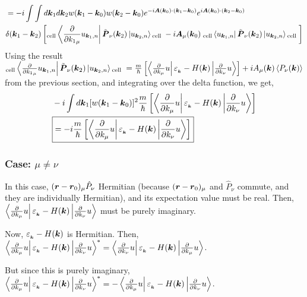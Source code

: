 \documentclass{report}
\renewcommand\vec[1]{\ensuremath\boldsymbol{#1}} %
\begin{document}
$$
\begin{aligned}
	& = -i \int \int d\vec{k}_1 d\vec{k}_2 w(\vec{k}_1 - \vec{k}_0) w(\vec{k}_2 - \vec{k}_0) e^{-i \vec{A}(\vec{k}_0)\cdot(\vec{k}_1 - \vec{k}_0)} e^{i \vec{A}(\vec{k}_0)\cdot(\vec{k}_2 - \vec{k}_0)} \\
	& \delta(\vec{k}_1 - \vec{k}_2) \left[ {}_{\text{cell}}\bra{\frac{\partial}{\partial {k_1}_\mu} u_{\vec{k}_1,n}} \tilde{\vec{P}}_\nu (\vec{k}_2) \ket{u_{\vec{k}_2,n}}{}_{\text{cell }} - i \vec{A}_\mu (\vec{k}_0) {}_{\text{  cell}}\bra{ u_{\vec{k}_1,n}} \tilde{\vec{P}}_\nu (\vec{k}_2) \ket{u_{\vec{k}_2,n}}{}_{\text{cell }} \right]
\end{aligned}
$$
Using the result ${}_{\text{cell}}\bra{\frac{\partial}{\partial {k_1}_\mu} u_{\vec{k}_1,n}} \tilde{\vec{P}}_\nu (\vec{k}_2) \ket{u_{\vec{k}_2,n}}{}_{\text{cell }} = \frac{m}{\hbar} \left[\bra{\frac{\partial}{\partial k_\mu} u}  \varepsilon_{_{\vec{k}}} - H(\vec{k}) \ket{\frac{\partial}{\partial k_\nu}u}\right]  +  i {A}_\mu(\vec{k}) \expval{{P}_\nu(\vec{k})}$ from the previous section, and integrating over the delta function, we get,
$$
\begin{aligned}
	& -i \int d\vec{k}_1  [w(\vec{k}_1 - \vec{k}_0)]^2  \frac{m}{\hbar} \left[\bra{\frac{\partial}{\partial k_\mu} u}  \varepsilon_{_{\vec{k}}} - H(\vec{k}) \ket{\frac{\partial}{\partial k_\nu}u}\right] \\
	& \boxed{= -i \frac{m}{\hbar} \left[\bra{\frac{\partial}{\partial k_\mu} u}  \varepsilon_{_{\vec{k}}} - H(\vec{k}) \ket{\frac{\partial}{\partial k_\nu}u}\right]}
\end{aligned}
$$
\subsubsection{Case: $\mu \neq \nu$}
In this case, $(\vec{r} - \vec{r}_0)_\mu \hat{P}_\nu$ Hermitian (because $(\vec{r} - \vec{r}_0)_\mu$ and $ \hat{P}_\nu$ commute, and they are individually Hermitian), and its expectation value must be real. Then, $ \bra{\frac{\partial}{\partial k_\mu} u}  \varepsilon_{_{\vec{k}}} - H(\vec{k}) \ket{\frac{\partial}{\partial k_\nu}u}$ must be purely imaginary.

Now, $\varepsilon_{_{\vec{k}}} - H(\vec{k})$ is Hermitian. Then, $ \bra{\frac{\partial}{\partial k_\mu} u}  \varepsilon_{_{\vec{k}}} - H(\vec{k}) \ket{\frac{\partial}{\partial k_\nu}u}^* =  \bra{\frac{\partial}{\partial k_\nu} u}  \varepsilon_{_{\vec{k}}} - H(\vec{k}) \ket{\frac{\partial}{\partial k_\mu}u}$.

But since this is purely imaginary, $ \bra{\frac{\partial}{\partial k_\mu} u}  \varepsilon_{_{\vec{k}}} - H(\vec{k}) \ket{\frac{\partial}{\partial k_\nu}u}^* = -  \bra{\frac{\partial}{\partial k_\mu} u}  \varepsilon_{_{\vec{k}}} - H(\vec{k}) \ket{\frac{\partial}{\partial k_\nu}u}$.
\end{document}
